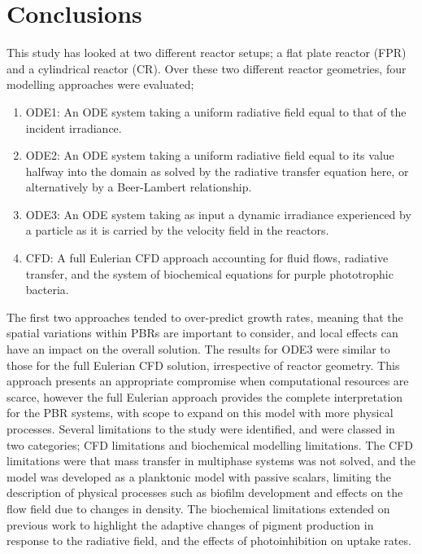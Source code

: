 \section{Conclusions}
This study has looked at two different reactor setups; a flat plate reactor (FPR) and a cylindrical reactor (CR). Over these two different reactor geometries, four modelling approaches were evaluated;
\begin{enumerate}
    \item ODE1: An ODE system taking a uniform radiative field equal to that of the incident irradiance.
    \item ODE2: An ODE system taking a uniform radiative field equal to its value halfway into the domain as solved by the radiative transfer equation here, or alternatively by a Beer-Lambert relationship.
    \item ODE3: An ODE system taking as input a dynamic irradiance experienced by a particle as it is carried by the velocity field in the reactors.
    \item CFD: A full Eulerian CFD approach accounting for fluid flows, radiative transfer, and the system of biochemical equations for purple phototrophic bacteria.
\end{enumerate}

The first two approaches tended to over-predict growth rates, meaning that the spatial variations within PBRs are important to consider, and local effects can have an impact on the overall solution. The results for ODE3 were similar to those for the full Eulerian CFD solution, irrespective of reactor geometry. This approach presents an appropriate compromise when computational resources are scarce, however the full Eulerian approach provides the complete interpretation for the PBR systems, with scope to expand on this model with more physical processes. 
\skippingparagraph
Several limitations to the study were identified, and were classed in two categories; CFD limitations and biochemical modelling limitations. The CFD limitations were that mass transfer in multiphase systems was not solved, and the model was developed as a planktonic model with passive scalars, limiting the description of physical processes such as biofilm development and effects on the flow field due to changes in density. The biochemical limitations extended on previous work to highlight the adaptive changes of pigment production in response to the radiative field, and the effects of photoinhibition on uptake rates.

